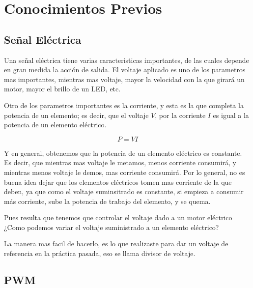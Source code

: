 
\section{Conocimientos Previos}


	\subsection{Señal Eléctrica}

		Una señal eléctrica tiene varias caracteristicas importantes, de las cuales depende en gran medida la acción de salida. El voltaje aplicado es uno de los parametros mas importantes, mientras mas voltaje, mayor la velocidad con la que girará un motor, mayor el brillo de un LED, etc.

		Otro de los parametros importantes es la corriente, y esta es la que completa la potencia de un elemento; es decir, que el voltaje $V$, por la corriente $I$ es igual a la potencia de un elemento eléctrico.

		\begin{equation}
			P = V I
		\end{equation}

		Y en general, obtenemos que la potencia de un elemento eléctrico es constante. Es decir, que mientras mas voltaje le metamos, menos corriente consumirá, y mientras menos voltaje le demos, mas corriente consumirá. Por lo general, no es buena idea dejar que los elementos eléctricos tomen mas corriente de la que deben, ya que como el voltaje suminsitrado es constante, si empieza a consumir más corriente, sube la potencia de trabajo del elemento, y se quema.

		Pues resulta que tenemos que controlar el voltaje dado a un motor eléctrico ¿Como podemos variar el voltaje suministrado a un elemento eléctrico?

		La manera mas facil de hacerlo, es lo que realizaste para dar un voltaje de referencia en la práctica pasada, eso se llama divisor de voltaje.


	\subsection{PWM}

